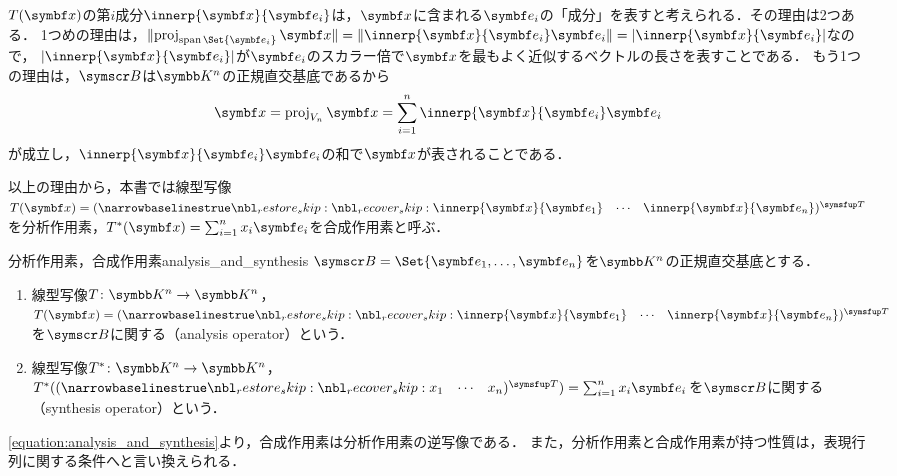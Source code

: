 \documentclass[../../main]{subfiles}
\begin{document}
\(T(\vect{x})\)の第\(i\)成分\(\innerp{\vect{x}}{\vect{e}_i}\)は，\(\vect{x}\)に含まれる\(\vect{e}_i\)の「成分」を表すと考えられる．その理由は2つある．
1つめの理由は，\(\vnorm{\proj_{\spannedby\Set{\vect{e}_i}}\vect{x}}=\vnorm{\innerp{\vect{x}}{\vect{e}_i}\vect{e}_i}=\abs{\innerp{\vect{x}}{\vect{e}_i}}\)なので，
\(\abs{\innerp{\vect{x}}{\vect{e}_i}}\)が\(\vect{e}_i\)のスカラー倍で\(\vect{x}\)を最もよく近似するベクトルの長さを表すことである．
もう1つの理由は，\(\basis{B}\)は\(\numset{K}^n\)の正規直交基底であるから
\begin{equation}
  \label{equation:analysis_and_synthesis}
  \vect{x} = \proj_{V_n}\vect{x}
  = \sum_{i=1}^n\innerp{\vect{x}}{\vect{e}_i}\vect{e}_i
\end{equation}
が成立し，\(\innerp{\vect{x}}{\vect{e}_i}\vect{e}_i\)の和で\(\vect{x}\)が表されることである．

以上の理由から，本書では線型写像\(T(\vect{x})=\trps{\rowvect{\innerp{\vect{x}}{\vect{e}_1} & \cdots & \innerp{\vect{x}}{\vect{e}_n}}}\)を分析作用素，\(\synth{T}(\vect{x})=\sum_{i=1}^nx_i\vect{e}_i\)を合成作用素と呼ぶ．

\begin{definition}{分析作用素，合成作用素}{analysis_and_synthesis}
  \(\basis{B}=\Set{\vect{e}_1,\dots,\vect{e}_n}\)を\(\numset{K}^n\)の正規直交基底とする．
  \begin{enumerate}
    \item 線型写像\(T\colon\numset{K}^n\to\numset{K}^n\)，\(T(\vect{x})=\trps{\rowvect{\innerp{\vect{x}}{\vect{e}_1} & \cdots & \innerp{\vect{x}}{\vect{e}_n}}}\)を\(\basis{B}\)に関する（analysis operator）という．
    \item 線型写像\(\synth{T}\colon\numset{K}^n\to\numset{K}^n\)，\(\synth{T}(\trps{\rowvect{x_1 & \cdots & x_n}})=\sum_{i=1}^nx_i\vect{e}_i\)を\(\basis{B}\)に関する（synthesis operator）という．
  \end{enumerate}
\end{definition}

\cref{equation:analysis_and_synthesis}より，合成作用素は分析作用素の逆写像である．
また，分析作用素と合成作用素が持つ性質は，表現行列に関する条件へと言い換えられる．
\end{document}
